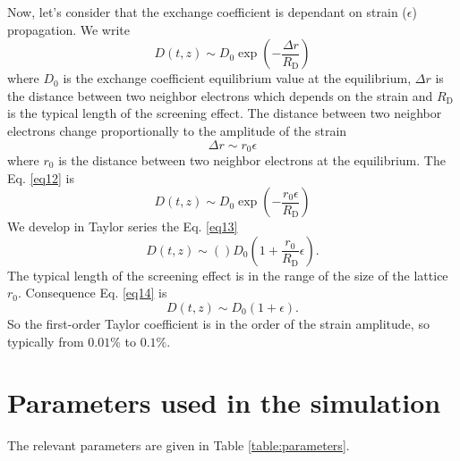 \documentclass[aps,prl,amsmath,amssymb,preprint,superscriptaddress]{revtex4-1}
\begin{document}
Now, let's consider that the exchange coefficient is dependant on strain ($\epsilon$) propagation.
We write
\begin{equation}
    D \left( t, z \right) \sim D_{0} \exp \left( -\frac{\Delta r}{R_{\mathrm{D}}} \right)
    \label{eq12}
\end{equation}
where $D_0$ is the exchange coefficient equilibrium value at the equilibrium, $\Delta r$ is the distance between two neighbor electrons which depends on the strain and $R_{\mathrm{D}}$ is the typical length of the screening effect.
The distance between two neighbor electrons change proportionally to the amplitude of the strain $$ \Delta r \sim r_0 \epsilon$$
where $r_0$ is the distance between two neighbor electrons at the equilibrium.
The Eq. \eqref{eq12} is
\begin{equation}
    D \left( t, z \right) \sim D_{0} \exp \left( -\frac{r_0 \epsilon}{R_{\mathrm{D}}} \right)
    \label{eq13}
\end{equation}
We develop in Taylor series the Eq. \eqref{eq13}
\begin{equation}
    D \left( t, z \right) \sim () D_{0} \left( 1 + \frac{r_0}{R_{\mathrm{D}}} \epsilon \right).
    \label{eq14}
\end{equation}
The typical length of the screening effect is in the range of the size of the lattice $r_0$.
Consequence Eq. \eqref{eq14} is
\begin{equation}
    D \left( t, z \right) \sim D_{0} \left( 1 + \epsilon \right).
    \label{eq15}
\end{equation}
So the first-order Taylor coefficient is in the order of the strain amplitude, so typically from $0.01 \%$ to $0.1\%$.

\section{Parameters used in the simulation}

The relevant parameters are given in Table \ref{table:parameters}.
\end{document}
